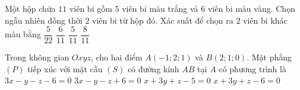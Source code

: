 \begin{ex}%
	Một hộp chứa $11$ viên bi gồm $5$ viên bi màu trắng và $6$ viên bi màu vàng. Chọn ngẫu nhiên đồng thời $2$ viên bi từ hộp đó. Xác suất để chọn ra $2$ viên bi khác màu bằng
	\choice
	{$\dfrac{5}{22}$}
	{\True $\dfrac{6}{11}$}
	{$\dfrac{5}{11}$}
	{$\dfrac{8}{11}$}
\end{ex}
\begin{ex}%
	Trong không gian $Oxyz$, cho hai điểm $A\left(- 1; 2; 1\right)$ và $B\left(2; 1; 0\right)$. Mặt phẳng $(P)$ tiếp xúc với mặt cầu $(S)$ có đường kính $AB$ tại $A$ có phương trình là
	\choice
	{$3x - y - z - 6=0$}
	{\True $3x - y - z + 6=0$}
	{$x + 3y + z - 5=0$}
	{$x + 3y + z - 6=0$}
\end{ex}

